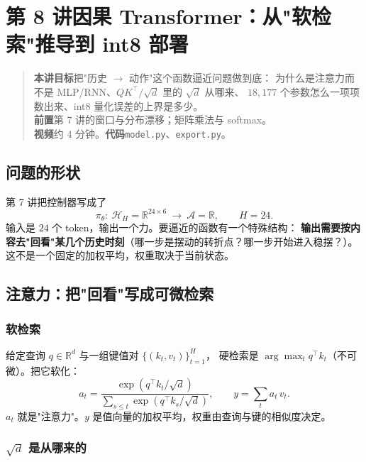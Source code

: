 \chapter[Transformer 策略]{第 8 讲\quad 因果 Transformer：从"软检索"推导到 int8 部署}
\label{ch:tf}

\begin{quote}\small
\textbf{本讲目标}\quad 把"历史 $\to$ 动作"这个函数逼近问题做到底：
为什么是注意力而不是 MLP/RNN、$QK^\top/\sqrt d$ 里的 $\sqrt d$ 从哪来、
$18{,}177$ 个参数怎么一项项数出来、int8 量化误差的上界是多少。\\[2pt]
\textbf{前置}\quad 第 7 讲的窗口与分布漂移；矩阵乘法与 softmax。\\
\textbf{视频}\quad 约 4 分钟。\quad\textbf{代码}\quad \texttt{model.py}、\texttt{export.py}。
\end{quote}

\section{问题的形状}

第 7 讲把控制器写成了
\begin{equation}
  \pi_\theta:\ \mathcal{H}_H=\mathbb{R}^{24\times6}\ \longrightarrow\ \mathcal{A}=\mathbb{R},
  \qquad H=24 .
\end{equation}
输入是 $24$ 个 token，输出一个力。要逼近的函数有一个特殊结构：
\textbf{输出需要按内容去"回看"某几个历史时刻}（哪一步是摆动的转折点？哪一步开始进入稳摆？）。
这不是一个固定的加权平均，权重取决于当前状态。

\section{注意力：把"回看"写成可微检索}

\subsection{软检索}

给定查询 $q\in\mathbb{R}^{d}$ 与一组键值对 $\{(k_t,v_t)\}_{t=1}^{H}$，
硬检索是 $\arg\max_t q^\top k_t$（不可微）。把它软化：
\begin{equation}
  a_t=\frac{\exp(q^\top k_t/\sqrt{d})}{\sum_{s\le t}\exp(q^\top k_s/\sqrt{d})},
  \qquad y=\sum_{t}a_t\,v_t .
  \label{eq:attn}
\end{equation}
$a_t$ 就是"注意力"。$y$ 是值向量的加权平均，权重由查询与键的相似度决定。

\subsection{$\sqrt{d}$ 是从哪来的}

